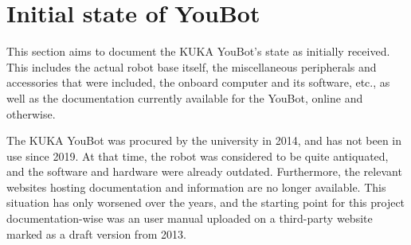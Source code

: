 \documentclass[a4paper, 12pt]{article}
\newif\ifshowadi
\newcommand{\adi}[1]{\ifshowadi\textcolor{red}{#1}\fi}
\newif\ifshownotes
\newcommand{\notes}[1]{\ifshownotes\textcolor{blue}{#1}\fi}
\begin{document}


    



        

    \pagebreak

    \section{Initial state of YouBot}

    \adi{reality check}

    This section aims to document the KUKA YouBot's state as initially received. This includes the actual robot base itself, the miscellaneous peripherals and accessories that were included, the onboard computer and its software, etc., as well as the documentation currently available for the YouBot, online and otherwise. 

    The KUKA YouBot was procured by the university in 2014, and has not been in use since 2019. At that time, the robot was considered to be quite antiquated, and the software and hardware were already outdated. Furthermore, the relevant websites hosting documentation and information are no longer available. This situation has only worsened over the years, and the starting point for this project documentation-wise was an user manual uploaded on a third-party website marked as a draft version from 2013.
\end{document}
